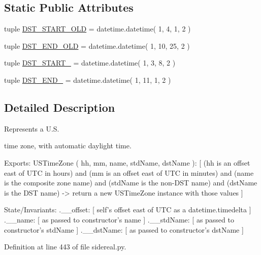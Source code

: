 \subsection*{Static Public Attributes}
\begin{DoxyCompactItemize}
\item 
tuple \hyperlink{classamonpy_1_1sim_1_1sidereal_1_1_u_s_time_zone_afea8d961d34e0b6a75bdad0f9ac41b34}{D\-S\-T\-\_\-\-S\-T\-A\-R\-T\-\_\-\-O\-L\-D} = datetime.\-datetime( 1, 4, 1, 2 )
\item 
tuple \hyperlink{classamonpy_1_1sim_1_1sidereal_1_1_u_s_time_zone_a4bb27c0cb6a5aefb11ed8c9ef9f4a5ea}{D\-S\-T\-\_\-\-E\-N\-D\-\_\-\-O\-L\-D} = datetime.\-datetime( 1, 10, 25, 2 )
\item 
tuple \hyperlink{classamonpy_1_1sim_1_1sidereal_1_1_u_s_time_zone_aa40ce77d299e1e3539f146b415383614}{D\-S\-T\-\_\-\-S\-T\-A\-R\-T\-\_} = datetime.\-datetime( 1, 3, 8, 2 )
\item 
tuple \hyperlink{classamonpy_1_1sim_1_1sidereal_1_1_u_s_time_zone_a96f5f104143b5b371c91ffbb4c01e1bd}{D\-S\-T\-\_\-\-E\-N\-D\-\_} = datetime.\-datetime( 1, 11, 1, 2 )
\end{DoxyCompactItemize}


\subsection{Detailed Description}
Represents a U.\-S. 

time zone, with automatic daylight time. \begin{DoxyVerb}  Exports:
    USTimeZone ( hh, mm, name, stdName, dstName ):
      [ (hh is an offset east of UTC in hours) and
        (mm is an offset east of UTC in minutes) and
        (name is the composite zone name) and
        (stdName is the non-DST name) and
        (dstName is the DST name) ->
          return a new USTimeZone instance with those values ]

  State/Invariants:
    .__offset:
      [ self's offset east of UTC as a datetime.timedelta ]
    .__name:      [ as passed to constructor's name ]
    .__stdName:   [ as passed to constructor's stdName ]
    .__dstName:   [ as passed to constructor's dstName ]\end{DoxyVerb}
 

Definition at line 443 of file sidereal.\-py.



